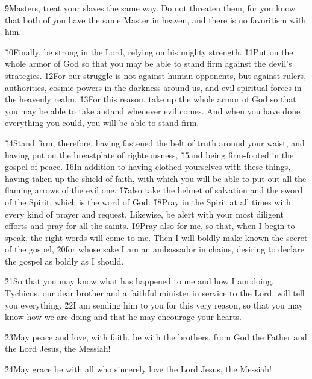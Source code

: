 \v{9}Masters, treat your slaves the same way. Do not threaten them, for you know that both of you have the same Master in heaven, and there is no favoritism with him.

\v{10}Finally, be strong in the Lord, relying on his mighty strength. \v{11}Put on the whole armor of God so that you may be able to stand firm against the devil's strategies. \v{12}For our struggle is not against human opponents, but against rulers, authorities, cosmic powers in the darkness around us, and evil spiritual forces in the heavenly realm. \v{13}For this reason, take up the whole armor of God so that you may be able to take a stand whenever evil comes. And when you have done everything you could, you will be able to stand firm.

\v{14}Stand firm, therefore, having fastened the belt of truth around your waist, and having put on the breastplate of righteousness, \v{15}and being firm-footed in the gospel of peace. \v{16}In addition to having clothed yourselves with these things, having taken up the shield of faith, with which you will be able to put out all the flaming arrows of the evil one, \v{17}also take the helmet of salvation and the sword of the Spirit, which is the word of God. \v{18}Pray in the Spirit at all times with every kind of prayer and request. Likewise, be alert with your most diligent efforts and pray for all the saints. \v{19}Pray also for me, so that, when I begin to speak, the right words will come to me. Then I will boldly make known the secret of the gospel, \v{20}for whose sake I am an ambassador in chains, desiring to declare the gospel as boldly as I should.

\v{21}So that you may know what has happened to me and how I am doing, Tychicus, our dear brother and a faithful minister in service to the Lord, will tell you everything. \v{22}I am sending him to you for this very reason, so that you may know how we are doing and that he may encourage your hearts.

\v{23}May peace and love, with faith, be with the brothers, from God the Father and the Lord Jesus, the Messiah!

\v{24}May grace be with all who sincerely love the Lord Jesus, the Messiah!
